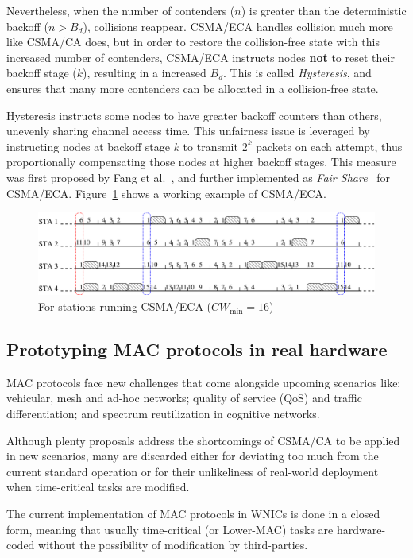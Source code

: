 Nevertheless, when the number of contenders ($n$) is greater than the deterministic backoff ($n>B_{d}$), collisions reappear. CSMA/ECA handles collision much more like CSMA/CA does, but in order to restore the collision-free state with this increased number of contenders, CSMA/ECA instructs nodes {\bfseries not} to reset their backoff stage ($k$), resulting in a increased $B_{d}$. This is called \emph{Hysteresis}, and ensures that many more contenders can be allocated in a collision-free state.

Hysteresis instructs some nodes to have greater backoff counters than others, unevenly sharing channel access time. This unfairness issue is leveraged by instructing nodes at backoff stage $k$ to transmit $2^{k}$ packets on each attempt, thus proportionally compensating those nodes at higher backoff stages. This measure was first proposed by Fang et al.~\cite{L_MAC2}, and further implemented as \emph{Fair Share}~\cite{research2standards} for CSMA/ECA. Figure~\ref{fig:csmaECA} shows a working example of CSMA/ECA.

\begin{figure}[htbp]
  \centering
  \includegraphics[width=\linewidth]{csma_eca_different_backoff_short.eps}
  \caption{For stations running CSMA/ECA ($CW_{\min}=16$)
  \label{fig:csmaECA}}
\end{figure}

\subsection{Prototyping MAC protocols in real hardware}
MAC protocols face new challenges that come alongside upcoming scenarios like: vehicular, mesh and ad-hoc networks; quality of service (QoS) and traffic differentiation; and spectrum reutilization in cognitive networks. 

Although plenty proposals address the shortcomings of CSMA/CA to be applied in new scenarios, many are discarded either for deviating too much from the current standard operation or for their unlikeliness of real-world deployment when time-critical tasks are modified.

The current implementation of MAC protocols in WNICs is done in a closed form, meaning that usually time-critical (or Lower-MAC) tasks are hardware-coded without the possibility of modification by third-parties.

